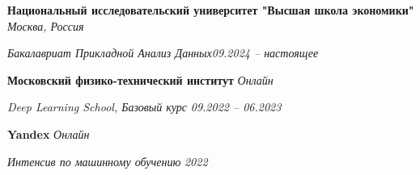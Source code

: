 
\textbf{Национальный исследовательский университет "Высшая школа экономики"} \hfill \emph{Москва, Россия}

	\textit{Бакалавриат Прикладной Анализ Данных}\hfill \emph{09.2024 – настоящее}\vspace{0.2cm}
	
	\textbf{Московский физико-технический институт} \hfill \emph{Онлайн}
	
\textit{Deep Learning School, Базовый курс} \hfill \emph{09.2022 – 06.2023}\vspace{0.2cm}

\textbf{Yandex} \hfill \emph{Онлайн}

\textit{Интенсив по машинному обучению} \hfill \emph{2022}